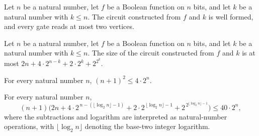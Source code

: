 \begin{theorem}
\label{BoolCircuit.Lupanov.lupDAG_isFaninTwo}
\leanok
{}
Let $n$ be a natural number, let $f$ be a Boolean function on $n$ bits, and let $k$ be a
natural number with $k\le n$. The circuit constructed from $f$ and $k$ is well formed,
and every gate reads at most two vertices.
\end{theorem}

\begin{theorem}
\label{BoolCircuit.Lupanov.lupDAG_size_le}
\leanok
{}
Let $n$ be a natural number, let $f$ be a Boolean function on $n$ bits, and let $k$ be a
natural number with $k\le n$. The size of the circuit constructed from $f$ and $k$ is
at most $2n+4\cdot 2^{n-k}+2\cdot 2^k+2^{2^k}$.
\end{theorem}

\begin{theorem}
\label{BoolCircuit.succ_sq_le_four_mul_two_pow}
\leanok
{}
For every natural number $n$, $(n+1)^2 \le 4\cdot 2^n$.
\end{theorem}

\begin{theorem}
\label{BoolCircuit.lupanov_arith}
\leanok
{}
For every natural number $n$,
\[
(n+1)\bigl(2n+4\cdot 2^{\,n-(\lfloor\log_2 n\rfloor-1)}+2\cdot 2^{\,\lfloor\log_2
n\rfloor-1}+2^{\,2^{\lfloor\log_2 n\rfloor-1}}\bigr)\le 40\cdot 2^n,
\]
where the subtractions and logarithm are interpreted as natural-number operations, with
$\lfloor\log_2 n\rfloor$ denoting the base-two integer logarithm.
\end{theorem}

